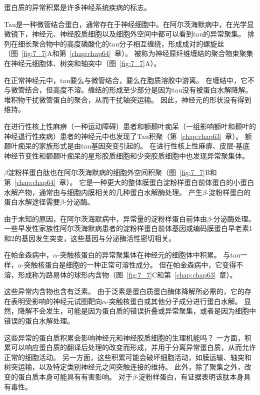 \begin{proposition}[神经解剖学导航术语] \label{box:7_1}
	
	\quad \quad 蛋白质的异常积累是许多神经系统疾病的标志。
	
	\quad \quad Tau是一种微管结合蛋白，通常存在于神经细胞中。在阿尔茨海默病中，在光学显微镜下，神经元、神经胶质细胞以及细胞外空间中都可以看到tau的异常聚集。
	排列在细长聚合物中的高度磷酸化的tau分子相互缠绕，形成成对的螺旋丝（图~\ref{fig:7_7}A和第~\ref{chap:chap64}~章）。
	被称为神经原纤维缠结的聚合物束聚集在神经元细胞体、树突和轴突中（图~\ref{fig:7_7}A）。
	
	\quad \quad 在正常神经元中，tau要么与微管结合，要么在胞质溶胶中游离。
	在缠结中，它不与微管结合，但高度不溶。缠结的形成至少部分是因为tau没有被蛋白水解降解。
	堆积物干扰微管蛋白的聚合，从而干扰轴突运输。
	因此，神经元的形状没有得到维持。
	
	\quad \quad 在进行性核上性麻痹（一种运动障碍）患者和额颞叶痴呆（一组影响额叶和颞叶的神经退行性疾病）患者的神经元中也发现了Tau积聚（第~\ref{chap:chap63}~章）。
	额颞叶痴呆的家族形式是由tau基因突变引起的。
	在进行性核上性麻痹、皮层-基底神经节变性和额颞叶痴呆的星形胶质细胞和少突胶质细胞中也发现异常聚集体。
	
	\quad \quad $\beta$淀粉样蛋白肽也在阿尔茨海默病的细胞外空间积聚（图~\ref{fig:7_7}B和第~\ref{chap:chap64}~章）。
	它是一种更大的整体膜蛋白淀粉样蛋白前体蛋白的小蛋白水解产物，通常由与细胞内膜相关的几种蛋白水解酶处理。
	产生$\beta$-淀粉样蛋白的蛋白水解途径需要$\beta$-分泌酶。
	
	\quad \quad 由于未知的原因，在阿尔茨海默病中，异常量的淀粉样蛋白前体由$\beta$-分泌酶处理。
	一些早发性家族性阿尔茨海默病患者的淀粉样蛋白前体基因或编码膜蛋白早老素1和2的基因发生突变，这些基因与分泌酶活性密切相关。
	
	\quad \quad 在帕金森病中，$\alpha$-突触核蛋白的异常聚集体在神经元的细胞体中积累。
	与tau一样，a-突触核蛋白是细胞的一种正常可溶性成分。
	但在帕金森病中，它变得不溶，形成称为路易体的球形内含物（图~\ref{fig:7_7}C和第~\ref{chap:chap63}~章）。
	
	\quad \quad 这些异常内含物也含有泛素。
	由于泛素是蛋白质蛋白酶体降解所必需的，它的存在表明受影响的神经元试图靶向$\alpha$-突触核蛋白或其他分子成分进行蛋白水解。
	显然，降解不会发生，可能是因为蛋白质的错误折叠或异常聚集，或者是因为细胞中错误的蛋白水解处理。
	
	\quad \quad 这些异常的蛋白质积累会影响神经元和神经胶质细胞的生理机能吗？
	一方面，积累可以响应蛋白质的翻译后处理的改变而形成，并用于分离异常蛋白质，从而允许正常的细胞活动。
	另一方面，这些积累可能会破坏细胞活动，如膜运输、轴突和树突运输，以及特定类别神经元之间突触连接的维持。
	此外，除了聚集之外，改变的蛋白质本身可能具有有害影响。
	对于$\beta$-淀粉样蛋白，有证据表明该肽本身具有毒性。
	
\end{proposition}


